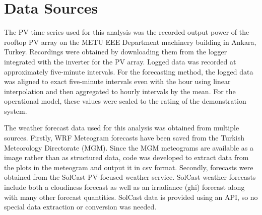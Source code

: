 \section{Data Sources}
\label{sec:data-source}

The PV time series used for this analysis was the recorded output power of the rooftop PV array on the METU EEE Department machinery building in Ankara, Turkey.
Recordings were obtained by downloading them from the logger integrated with the inverter for the PV array.
Logged data was recorded at approximately five-minute intervals.
For the forecasting method, the logged data was aligned to exact five-minute intervals even with the hour using linear interpolation and then aggregated to hourly intervals by the mean.
For the operational model, these values were scaled to the rating of the demonstration system.


The weather forecast data used for this analysis was obtained from multiple sources.
Firstly, WRF Meteogram forecasts have been saved from the Turkish Meteorology Directorate (MGM)\cite{MGM_Meteogram}.
Since the MGM meteograms are available as a image rather than as structured data, code was developed to extract data from the plots in the meteogram and output it in csv format\cite{MeteogramExtractGithubRepo}.
Secondly, forecasts were obtained from the SolCast PV-focused weather service\cite{Solcast}.
SolCast weather forecasts include both a cloudiness forecast as well as an irradiance (ghi) forecast along with many other forecast quantities.
SolCast data is provided using an API, so no special data extraction or conversion was needed.

